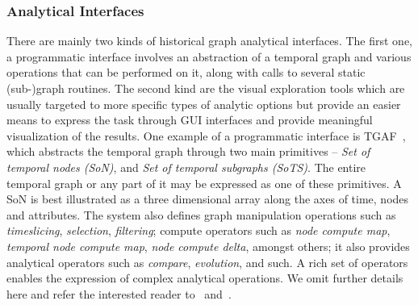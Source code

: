 \documentclass[graybox, natbib, nosecnum, twocolumn]{svmult}
\begin{document}


\subsubsection{Analytical Interfaces}
There are mainly two kinds of historical graph analytical interfaces. The first one, a programmatic interface involves an abstraction of a temporal graph and various operations that can be performed on it, along with calls to several static (sub-)graph routines. The second kind are the visual exploration tools which are usually targeted to more specific types of analytic options but provide an easier means to express the task through GUI interfaces and provide meaningful visualization of the results. One example of a programmatic interface is TGAF~\citep{khurana2016storing}, which abstracts the temporal graph through two main primitives --  {\em Set of temporal nodes (SoN)}, and {\em Set of temporal subgraphs (SoTS)}. The entire temporal graph or any part of it may be expressed as one of these primitives. A SoN is best illustrated as a three dimensional array along the axes of time, nodes and attributes. The system also defines graph manipulation operations such as {\em timeslicing}, {\em selection}, {\em filtering}; compute operators such as {\em node compute map}, {\em temporal node compute map}, {\em node compute delta}, amongst others; it also provides analytical operators such as {\em compare}, {\em evolution}, and such. A rich set of operators enables the expression of complex analytical operations. We omit further details here and refer the interested reader to~\cite{khurana2016storing} and~\cite{khurana2015historical}.
\end{document}
